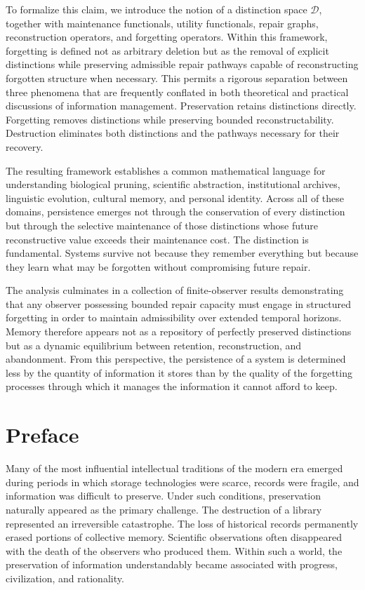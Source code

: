 \documentclass[12pt,oneside]{book}
\theoremstyle{plain} \newtheorem{theorem}{Theorem}[chapter] \newtheorem{lemma}[theorem]{Lemma} \newtheorem{proposition}[theorem]{Proposition} \newtheorem{corollary}[theorem]{Corollary}
\theoremstyle{definition} \newtheorem{definition}[theorem]{Definition} \newtheorem{axiom}[theorem]{Axiom} \newtheorem{construction}[theorem]{Construction}
\theoremstyle{remark} \newtheorem{remark}[theorem]{Remark} \newtheorem{example}[theorem]{Example}
\newcommand{\D}{\mathcal{D}} \newcommand{\R}{\mathcal{R}} \newcommand{\F}{\mathcal{F}} \newcommand{\U}{\mathcal{U}} \newcommand{\M}{\mathcal{M}} \newcommand{\G}{\Gamma}
\begin{document}
To formalize this claim, we introduce the notion of a distinction space $\D$, together with maintenance functionals, utility functionals, repair graphs, reconstruction operators, and forgetting operators. Within this framework, forgetting is defined not as arbitrary deletion but as the removal of explicit distinctions while preserving admissible repair pathways capable of reconstructing forgotten structure when necessary. This permits a rigorous separation between three phenomena that are frequently conflated in both theoretical and practical discussions of information management. Preservation retains distinctions directly. Forgetting removes distinctions while preserving bounded reconstructability. Destruction eliminates both distinctions and the pathways necessary for their recovery.

The resulting framework establishes a common mathematical language for understanding biological pruning, scientific abstraction, institutional archives, linguistic evolution, cultural memory, and personal identity. Across all of these domains, persistence emerges not through the conservation of every distinction but through the selective maintenance of those distinctions whose future reconstructive value exceeds their maintenance cost. The distinction is fundamental. Systems survive not because they remember everything but because they learn what may be forgotten without compromising future repair.

The analysis culminates in a collection of finite-observer results demonstrating that any observer possessing bounded repair capacity must engage in structured forgetting in order to maintain admissibility over extended temporal horizons. Memory therefore appears not as a repository of perfectly preserved distinctions but as a dynamic equilibrium between retention, reconstruction, and abandonment. From this perspective, the persistence of a system is determined less by the quantity of information it stores than by the quality of the forgetting processes through which it manages the information it cannot afford to keep.

\newpage

\tableofcontents

\newpage

\chapter*{Preface}

Many of the most influential intellectual traditions of the modern era emerged during periods in which storage technologies were scarce, records were fragile, and information was difficult to preserve. Under such conditions, preservation naturally appeared as the primary challenge. The destruction of a library represented an irreversible catastrophe. The loss of historical records permanently erased portions of collective memory. Scientific observations often disappeared with the death of the observers who produced them. Within such a world, the preservation of information understandably became associated with progress, civilization, and rationality.
\end{document}
